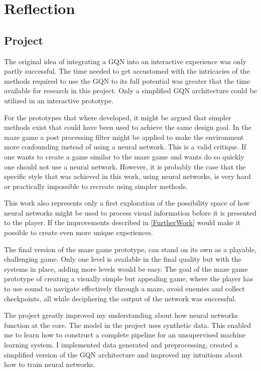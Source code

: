 
\chapter{Reflection}
\section{Project}
The original idea of integrating a GQN into an interactive experience was only partly successful. The time needed to get accustomed with the intricacies of the methods required to use the GQN to its full potential was greater that the time available for research in this project. Only a simplified GQN architecture could be utilized in an interactive prototype.

For the prototypes that where developed, it might be argued that simpler methods exist that could have been used to achieve the same design goal. In the maze game a post processing filter might be applied to make the environment more confounding instead of using a neural network. This is a valid critique. If one wants to create a game similar to the maze game and wants do so quickly one should not use a neural network. However, it is probably the case that the specific style that was achieved in this work, using neural networks, is very hard or practically impossible to recreate using simpler methods.

This work also represents only a first exploration of the possibility space of how neural networks might be used to process visual information before it is presented to the player. If the improvements described in \cref{FurtherWork} would make it possible to create even more unique experiences.

The final version of the maze game prototype, can stand on its own as a playable, challenging game. Only one level is available in the final quality but with the systems in place, adding more levels would be easy. The goal of the maze game prototype of creating a visually simple but appealing game, where the player has to use sound to navigate effectively through a maze, avoid enemies and collect checkpoints, all while deciphering the output of the network was successful.

The project greatly improved my understanding about how neural networks function at the core. The model in the project uses synthetic data. This enabled me to learn how to construct a complete pipeline for an unsupervised machine learning system. I implemented data generated and preprocessing, created a simplified version of the GQN architecture and improved my intuitions about how to train neural networks.


